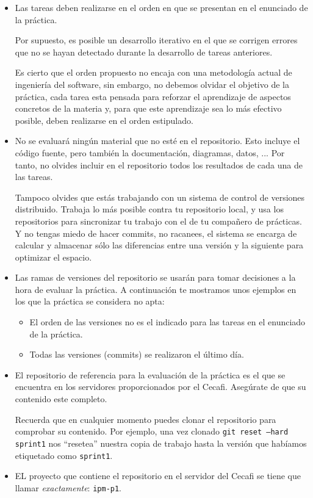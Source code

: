 \documentclass[11pt,a4paper]{article}
\begin{document}
\begin{itemize}
\item Las tareas deben realizarse en el orden en que se presentan en
  el enunciado de la práctica.

  Por supuesto, es posible un desarrollo iterativo en el que se
  corrigen errores que no se hayan detectado durante la desarrollo de
  tareas anteriores.

  Es cierto que el orden propuesto no encaja con una metodología
  actual de ingeniería del software, sin embargo, no debemos olvidar
  el objetivo de la práctica, cada tarea esta pensada para reforzar el
  aprendizaje de aspectos concretos de la materia y, para que este
  aprendizaje sea lo más efectivo posible, deben realizarse en el
  orden estipulado.

\item No se evaluará ningún material que no esté en el
  repositorio. Esto incluye el código fuente, pero también la
  documentación, diagramas, datos, ... Por tanto, no olvides incluir
  en el repositorio todos los resultados de cada una de las tareas.

  Tampoco olvides que estás trabajando con un sistema de control de
  versiones distribuido. Trabaja lo más posible contra tu repositorio
  local, y usa los repositorios para sincronizar tu trabajo con el de
  tu compañero de prácticas. Y no tengas miedo de hacer commits, no
  racanees, el sistema se encarga de calcular y almacenar sólo las
  diferencias entre una versión y la siguiente para optimizar el
  espacio.

\item Las ramas de versiones del repositorio se usarán para tomar
  decisiones a la hora de evaluar la práctica.  A continuación te
  mostramos unos ejemplos en los que la práctica se considera no apta:

  \begin{itemize}
  \item El orden de las versiones no es el indicado para las tareas en
    el enunciado de la práctica.
  \item Todas las versiones (commits) se realizaron el último día.
  \end{itemize} 
  
\item El repositorio de referencia para la evaluación de la práctica
  es el que se encuentra en los servidores proporcionados por el
  Cecafi. Asegúrate de que su contenido este completo.

  Recuerda que en cualquier momento puedes clonar el repositorio para
  comprobar su contenido. Por ejemplo, una vez clonado \texttt{git
    reset --hard sprint1} nos ``resetea'' nuestra copia de trabajo
  hasta la versión que habíamos etiquetado como \texttt{sprint1}.

\item EL proyecto que contiene el repositorio en el servidor del
  Cecafi se tiene que llamar \emph{exactamente}: \texttt{ipm-p1}.
\end{itemize}
\end{document}
